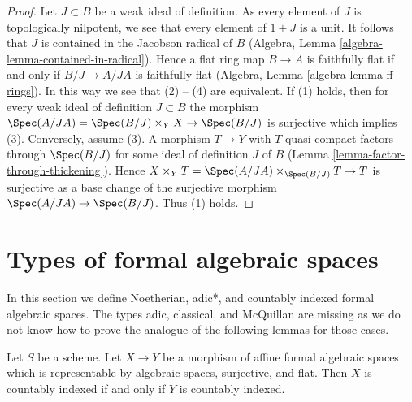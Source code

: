 \begin{proof}
Let $J \subset B$ be a weak ideal of definition. As every element of $J$
is topologically nilpotent, we see that every element of $1 + J$ is
a unit. It follows that $J$ is contained in the Jacobson radical of $B$
(Algebra, Lemma \ref{algebra-lemma-contained-in-radical}).
Hence a flat ring map $B \to A$ is faithfully flat if and only if
$B/J \to A/JA$ is faithfully flat
(Algebra, Lemma \ref{algebra-lemma-ff-rings}).
In this way we see that (2) -- (4) are equivalent.
If (1) holds, then for every weak ideal of definition $J \subset B$
the morphism
$\Spec(A/JA) = \Spec(B/J) \times_Y X \to \Spec(B/J)$ is surjective
which implies (3). Conversely, assume (3).
A morphism $T \to Y$ with $T$ quasi-compact
factors through $\Spec(B/J)$ for some ideal of definition $J$ of $B$
(Lemma \ref{lemma-factor-through-thickening}).
Hence $X \times_Y T = \Spec(A/JA) \times_{\Spec(B/J)} T \to T$
is surjective as a base change of the surjective morphism
$\Spec(A/JA) \to \Spec(B/J)$. Thus (1) holds.
\end{proof}





\section{Types of formal algebraic spaces}
\label{section-types}

\noindent
In this section we define Noetherian, adic*, and
countably indexed formal algebraic spaces. The types
adic, classical, and McQuillan are missing as we do not
know how to prove the analogue of the following lemmas
for those cases.

\begin{lemma}
\label{lemma-iff-countably-indexed}
Let $S$ be a scheme. Let $X \to Y$ be a morphism of affine
formal algebraic spaces which is representable by algebraic spaces,
surjective, and flat. Then $X$ is countably indexed if and only
if $Y$ is countably indexed.
\end{lemma}

